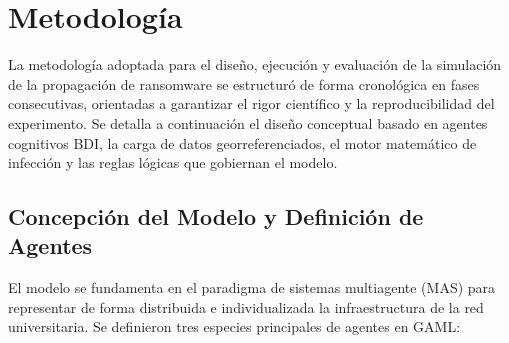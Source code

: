 \section{Metodología}
\label{sec:metodologia}
La metodología adoptada para el diseño, ejecución y evaluación de la simulación de la propagación de ransomware se estructuró de forma cronológica en fases consecutivas, orientadas a garantizar el rigor científico y la reproducibilidad del experimento. Se detalla a continuación el diseño conceptual basado en agentes cognitivos BDI, la carga de datos georreferenciados, el motor matemático de infección y las reglas lógicas que gobiernan el modelo.

\subsection{Concepción del Modelo y Definición de Agentes}
El modelo se fundamenta en el paradigma de sistemas multiagente (MAS) para representar de forma distribuida e individualizada la infraestructura de la red universitaria. Se definieron tres especies principales de agentes en GAML:
